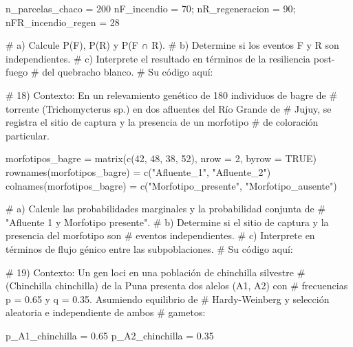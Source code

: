 \documentclass[
  spanish,
  letterpaper,
  DIV=11,
  numbers=noendperiod]{scrreprt}
\newenvironment{Shaded}{\begin{snugshade}}{\end{snugshade}}
\newcommand{\AttributeTok}[1]{\textcolor[rgb]{0.40,0.45,0.13}{#1}}
\newcommand{\CommentTok}[1]{\textcolor[rgb]{0.37,0.37,0.37}{#1}}
\newcommand{\ConstantTok}[1]{\textcolor[rgb]{0.56,0.35,0.01}{#1}}
\newcommand{\DecValTok}[1]{\textcolor[rgb]{0.68,0.00,0.00}{#1}}
\newcommand{\FloatTok}[1]{\textcolor[rgb]{0.68,0.00,0.00}{#1}}
\newcommand{\FunctionTok}[1]{\textcolor[rgb]{0.28,0.35,0.67}{#1}}
\newcommand{\NormalTok}[1]{\textcolor[rgb]{0.00,0.23,0.31}{#1}}
\newcommand{\OtherTok}[1]{\textcolor[rgb]{0.00,0.23,0.31}{#1}}
\newcommand{\StringTok}[1]{\textcolor[rgb]{0.13,0.47,0.30}{#1}}
\begin{document}
\begin{Shaded}
\begin{Highlighting}[]
\NormalTok{n\_parcelas\_chaco }\OtherTok{=} \DecValTok{200}
\NormalTok{nF\_incendio }\OtherTok{=} \DecValTok{70}\NormalTok{; nR\_regeneracion }\OtherTok{=} \DecValTok{90}\NormalTok{; nFR\_incendio\_regen }\OtherTok{=} \DecValTok{28}

\CommentTok{\#     a) Calcule P(F), P(R) y P(F ∩ R).}
\CommentTok{\#     b) Determine si los eventos F y R son independientes.}
\CommentTok{\#     c) Interprete el resultado en términos de la resiliencia post{-}fuego}
\CommentTok{\#        del quebracho blanco.}
\CommentTok{\# Su código aquí:}


\CommentTok{\# 18) Contexto: En un relevamiento genético de 180 individuos de bagre de}
\CommentTok{\#     torrente (Trichomycterus sp.) en dos afluentes del Río Grande de}
\CommentTok{\#     Jujuy, se registra el sitio de captura y la presencia de un morfotipo}
\CommentTok{\#     de coloración particular.}

\NormalTok{morfotipos\_bagre }\OtherTok{=} \FunctionTok{matrix}\NormalTok{(}\FunctionTok{c}\NormalTok{(}\DecValTok{42}\NormalTok{, }\DecValTok{48}\NormalTok{, }\DecValTok{38}\NormalTok{, }\DecValTok{52}\NormalTok{), }\AttributeTok{nrow =} \DecValTok{2}\NormalTok{, }\AttributeTok{byrow =} \ConstantTok{TRUE}\NormalTok{)}
\FunctionTok{rownames}\NormalTok{(morfotipos\_bagre) }\OtherTok{=} \FunctionTok{c}\NormalTok{(}\StringTok{"Afluente\_1"}\NormalTok{, }\StringTok{"Afluente\_2"}\NormalTok{)}
\FunctionTok{colnames}\NormalTok{(morfotipos\_bagre) }\OtherTok{=} \FunctionTok{c}\NormalTok{(}\StringTok{"Morfotipo\_presente"}\NormalTok{, }\StringTok{"Morfotipo\_ausente"}\NormalTok{)}

\CommentTok{\#     a) Calcule las probabilidades marginales y la probabilidad conjunta de}
\CommentTok{\#        "Afluente 1 y Morfotipo presente".}
\CommentTok{\#     b) Determine si el sitio de captura y la presencia del morfotipo son}
\CommentTok{\#        eventos independientes.}
\CommentTok{\#     c) Interprete en términos de flujo génico entre las subpoblaciones.}
\CommentTok{\# Su código aquí:}


\CommentTok{\# 19) Contexto: Un gen loci en una población de chinchilla silvestre}
\CommentTok{\#     (Chinchilla chinchilla) de la Puna presenta dos alelos (A1, A2) con}
\CommentTok{\#     frecuencias p = 0.65 y q = 0.35. Asumiendo equilibrio de}
\CommentTok{\#     Hardy{-}Weinberg y selección aleatoria e independiente de ambos}
\CommentTok{\#     gametos:}

\NormalTok{p\_A1\_chinchilla }\OtherTok{=} \FloatTok{0.65}
\NormalTok{p\_A2\_chinchilla }\OtherTok{=} \FloatTok{0.35}


\end{Highlighting}
\end{Shaded}
\end{document}
